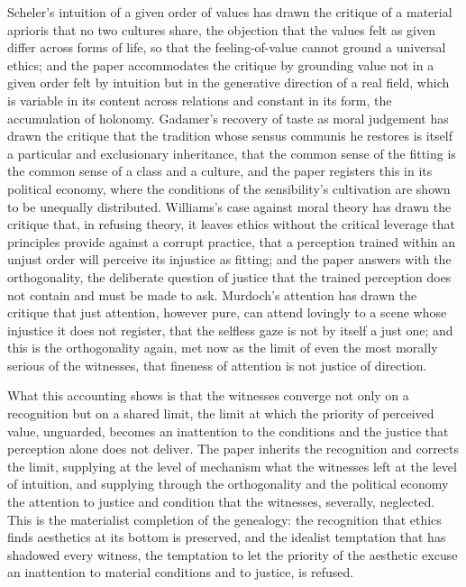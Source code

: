 Scheler's intuition of a given order of values has drawn the critique of a material aprioris that no two cultures share, the objection that the values felt as given differ across forms of life, so that the feeling-of-value cannot ground a universal ethics; and the paper accommodates the critique by grounding value not in a given order felt by intuition but in the generative direction of a real field, which is variable in its content across relations and constant in its form, the accumulation of holonomy. Gadamer's recovery of taste as moral judgement has drawn the critique that the tradition whose sensus communis he restores is itself a particular and exclusionary inheritance, that the common sense of the fitting is the common sense of a class and a culture, and the paper registers this in its political economy, where the conditions of the sensibility's cultivation are shown to be unequally distributed. Williams's case against moral theory has drawn the critique that, in refusing theory, it leaves ethics without the critical leverage that principles provide against a corrupt practice, that a perception trained within an unjust order will perceive its injustice as fitting; and the paper answers with the orthogonality, the deliberate question of justice that the trained perception does not contain and must be made to ask. Murdoch's attention has drawn the critique that just attention, however pure, can attend lovingly to a scene whose injustice it does not register, that the selfless gaze is not by itself a just one; and this is the orthogonality again, met now as the limit of even the most morally serious of the witnesses, that fineness of attention is not justice of direction.

What this accounting shows is that the witnesses converge not only on a recognition but on a shared limit, the limit at which the priority of perceived value, unguarded, becomes an inattention to the conditions and the justice that perception alone does not deliver. The paper inherits the recognition and corrects the limit, supplying at the level of mechanism what the witnesses left at the level of intuition, and supplying through the orthogonality and the political economy the attention to justice and condition that the witnesses, severally, neglected. This is the materialist completion of the genealogy: the recognition that ethics finds aesthetics at its bottom is preserved, and the idealist temptation that has shadowed every witness, the temptation to let the priority of the aesthetic excuse an inattention to material conditions and to justice, is refused.

